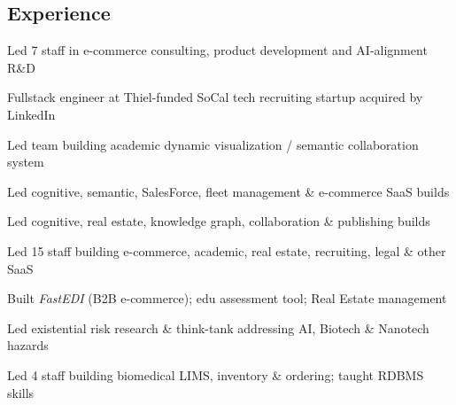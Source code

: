 \documentclass[line,margin,hidelinks]{res}
\begin{document}
\begin{resume}

\section{Experience}


\begin{position}
Led 7 staff in e-commerce consulting, product development and AI-alignment R\&D
\end{position}

\parskip=3.5pt %


\begin{position}
Fullstack engineer at Thiel-funded SoCal tech recruiting startup acquired by LinkedIn
\end{position}


\begin{position}
Led team building academic dynamic visualization / semantic collaboration system
\end{position}


\begin{position}
Led cognitive, semantic, SalesForce, fleet management \& e-commerce SaaS builds
\end{position}


\begin{position}
Led cognitive, real estate, knowledge graph, collaboration \& publishing builds
\end{position}


\begin{position}
Led 15 staff building e-commerce, academic, real estate, recruiting, legal \& other SaaS
\end{position}


\begin{position}
Built \textit{FastEDI} (B2B e-commerce);
edu assessment tool;
Real Estate management
\end{position}


\begin{position}
Led existential risk research \& think-tank addressing AI, Biotech \& Nanotech hazards
\end{position}


\begin{position}
Led 4 staff building biomedical LIMS, inventory \& ordering;
taught RDBMS skills
\end{position}


\end{resume}
\end{document}
